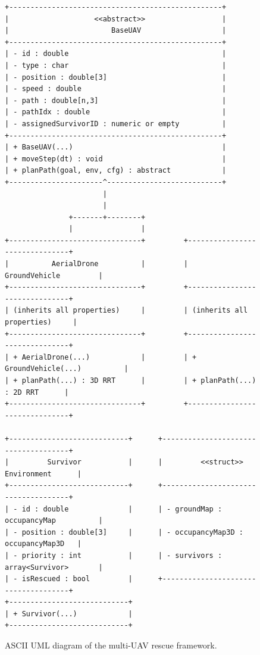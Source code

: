 \documentclass[12pt,a4paper]{report}
\begin{document}
\begin{figure}[ht]
\centering
\begin{verbatim}
+--------------------------------------------------+
|                    <<abstract>>                  |
|                        BaseUAV                   |
+--------------------------------------------------+
| - id : double                                    |
| - type : char                                    |
| - position : double[3]                           |
| - speed : double                                 |
| - path : double[n,3]                             |
| - pathIdx : double                               |
| - assignedSurvivorID : numeric or empty          |
+--------------------------------------------------+
| + BaseUAV(...)                                   |
| + moveStep(dt) : void                            |
| + planPath(goal, env, cfg) : abstract            |
+----------------------^---------------------------+
                       |
                       |
               +-------+--------+
               |                |
+-------------------------------+         +-------------------------------+
|          AerialDrone          |         |         GroundVehicle         |
+-------------------------------+         +-------------------------------+
| (inherits all properties)     |         | (inherits all properties)     |
+-------------------------------+         +-------------------------------+
| + AerialDrone(...)            |         | + GroundVehicle(...)          |
| + planPath(...) : 3D RRT      |         | + planPath(...) : 2D RRT      |
+-------------------------------+         +-------------------------------+

+----------------------------+      +-------------------------------------+
|         Survivor           |      |         <<struct>> Environment      |
+----------------------------+      +-------------------------------------+
| - id : double              |      | - groundMap : occupancyMap          |
| - position : double[3]     |      | - occupancyMap3D : occupancyMap3D   |
| - priority : int           |      | - survivors : array<Survivor>       |
| - isRescued : bool         |      +-------------------------------------+
+----------------------------+
| + Survivor(...)            |
+----------------------------+
\end{verbatim}
\caption{ASCII UML diagram of the multi-UAV rescue framework.}
\label{fig:architectureDiagram}
\end{figure}
\end{document}

